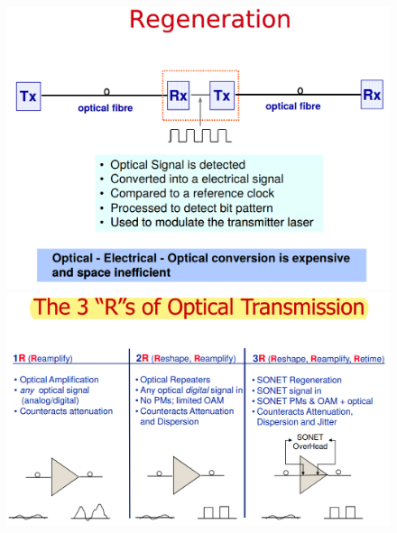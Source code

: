 \documentclass[8pt]{extarticle}
\begin{document}
\begin{figure}[H]
    \centering
    \begin{minipage}[c]{\linewidth}
        \begin{minipage}[l]{0.43\linewidth}
            \includegraphics[width=\linewidth]{images/FO15.png}
        \end{minipage}
        \hspace{0.04\linewidth}
        \begin{minipage}[l]{0.53\linewidth}
            \includegraphics[width=\linewidth]{images/FO16.png}
        \end{minipage}
    \end{minipage}
\end{figure}
\end{document}
